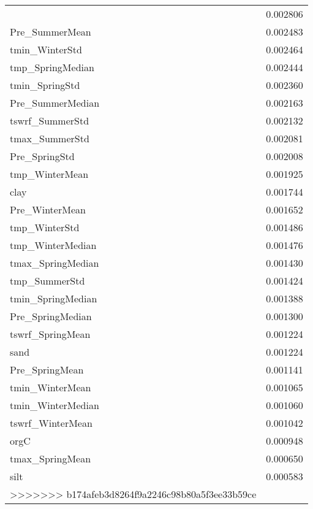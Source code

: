 \begin{tabular}{lr}
\begin{tabular}{rrrrr}
Pre_SummerStd & 0.002806 \\
Pre_SummerMean & 0.002483 \\
tmin_WinterStd & 0.002464 \\
tmp_SpringMedian & 0.002444 \\
tmin_SpringStd & 0.002360 \\
Pre_SummerMedian & 0.002163 \\
tswrf_SummerStd & 0.002132 \\
tmax_SummerStd & 0.002081 \\
Pre_SpringStd & 0.002008 \\
tmp_WinterMean & 0.001925 \\
clay & 0.001744 \\
Pre_WinterMean & 0.001652 \\
tmp_WinterStd & 0.001486 \\
tmp_WinterMedian & 0.001476 \\
tmax_SpringMedian & 0.001430 \\
tmp_SummerStd & 0.001424 \\
tmin_SpringMedian & 0.001388 \\
Pre_SpringMedian & 0.001300 \\
tswrf_SpringMean & 0.001224 \\
sand & 0.001224 \\
Pre_SpringMean & 0.001141 \\
tmin_WinterMean & 0.001065 \\
tmin_WinterMedian & 0.001060 \\
tswrf_WinterMean & 0.001042 \\
orgC & 0.000948 \\
tmax_SpringMean & 0.000650 \\
silt & 0.000583 \\
>>>>>>> b174afeb3d8264f9a2246c98b80a5f3ee33b59ce
\bottomrule
\end{tabular}
